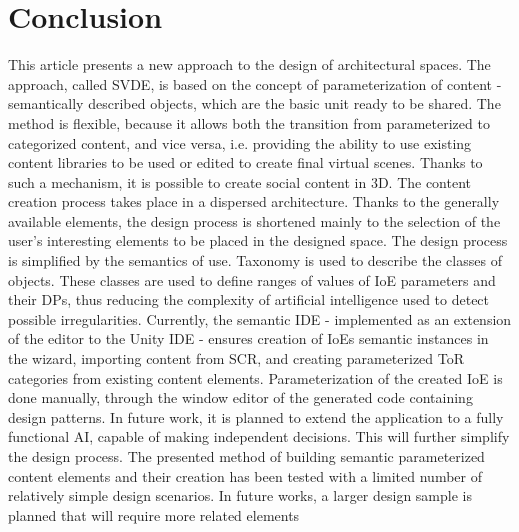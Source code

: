 \documentclass[runningheads]{llncs}
\begin{document}
\section{Conclusion}
This article presents a new approach to the design of architectural spaces. The approach, called SVDE, is based on the concept of parameterization of content - semantically described objects, which are the basic unit ready to be shared. The method is flexible, because it allows both the transition from parameterized to categorized content, and vice versa, i.e. providing the ability to use existing content libraries to be used or edited to create final virtual scenes. Thanks to such a mechanism, it is possible to create social content in 3D. The content creation process takes place in a dispersed architecture. Thanks to the generally available elements, the design process is shortened mainly to the selection of the user's interesting elements to be placed in the designed space. The design process is simplified by the semantics of use. Taxonomy is used to describe the classes of objects. These classes are used to define ranges of values of IoE parameters and their DPs, thus reducing the complexity of artificial intelligence used to detect possible irregularities. Currently, the semantic IDE - implemented as an extension of the editor to the Unity IDE - ensures creation of IoEs semantic instances in the wizard, importing content from SCR, and creating parameterized ToR categories from existing content elements. Parameterization of the created IoE is done manually, through the window editor of the generated code containing design patterns. In future work, it is planned to extend the application to a fully functional AI, capable of making independent decisions. This will further simplify the design process. The presented method of building semantic parameterized content elements and their creation has been tested with a limited number of relatively simple design scenarios. In future works, a larger design sample is planned that will require more related elements
\end{document}
